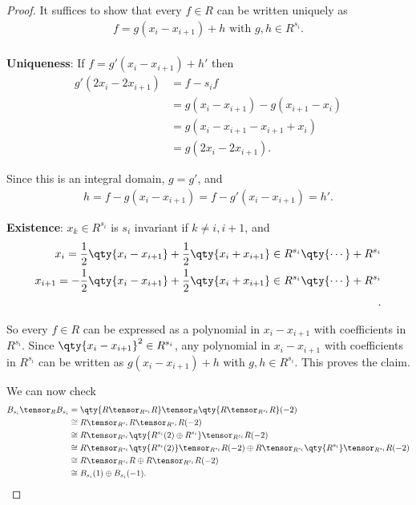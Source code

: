 \begin{proof}

It suffices to show that every \(f\in R\) can be written uniquely as
\begin{align*}
f = g(x_i - x_{i+1}) + h  \text{  with } g, h \in R^{s_i}
.\end{align*}\\

\textbf{Uniqueness}: If \(f =g'(x_i - x_{i+1}) + h'\) then
\begin{align*}
g'(2x_i - 2x_{i+1}) 
&= f - s_i f \\
&= g(x_i - x_{i+1}) - g(x_{i+1} - x_i)  \\
&= g(x_i - x_{i+1} - x_{i+1} + x_i) \\
&= g(2x_i - 2x_{i+1})
.\end{align*}

Since this is an integral domain, \(g=g'\), and
\begin{align*}
h = f - g (x_i - x_{i+1}) = f - g'(x_i - x_{i+1}) = h'
.\end{align*}

\textbf{Existence}: \(x_k \in R^{s_i}\) is \(s_i\) invariant if
\(k\neq i, i+1\), and
\begin{align*}
x_i = {1\over 2}\qty{ x_i - x_{i+1}} + {1\over 2}\qty{x_i + x_{i+1}} \in R^{s_i} \qty{\cdots} + R^{s_i}  \\
x_{i+1} = -{1\over 2}\qty{ x_i - x_{i+1}} + {1\over 2}\qty{x_i + x_{i+1}} \in R^{s_i} \qty{\cdots} + R^{s_i}  \\
.\end{align*}

So every \(f\in R\) can be expressed as a polynomial in
\(x_i - x_{i+1}\) with coefficients in \(R^{s_i}\). Since
\(\qty{x_i - x_{i+1}}^2 \in R^{s_i}\), any polynomial in
\(x_i - x_{i+1}\) with coefficients in \(R^{s_i}\) can be written as
\(g(x_i - x_{i+1}) + h\) with \(g, h \in R^{s_i}\). This proves the
claim.

We can now check
\begin{align*}
B_{s_i} \tensor_R B_{s_i} 
&=
\qty{R \tensor_{R^{s_i}} R} \tensor_R 
\qty{R \tensor_{R^{s_i}} R}(-2) \\
&\cong R \tensor_{R^{s_i}} R \tensor_{R^{s_i}} R(-2) \\
&\cong R \tensor_{R^{s_i}} \qty{ R^{s_i}(2) \oplus R^{s_i}  } \tensor_{R^{s_i}} R(-2) \\
&\cong R \tensor_{R^{s_i}} \qty{ R^{s_i}(2)   } \tensor_{R^{s_i}} R(-2)  \oplus
R \tensor_{R^{s_i}} \qty{ R^{s_i}  } \tensor_{R^{s_i}} R(-2) \\
&\cong R \tensor_{R^{s_i}} R \oplus R\tensor_{R^{s_i}} R(-2) \\
&\cong B_{s_i}(1) \oplus B_{s_i}(-1)
.\end{align*}

\end{proof}

